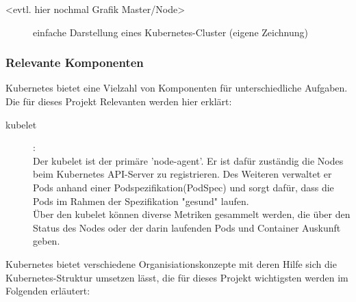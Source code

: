\documentclass[a4paper,10pt]{scrartcl}
\begin{document}
<evtl. hier nochmal Grafik Master/Node>


\begin{figure}[htbp]
  \centering
  
  \caption{einfache Darstellung eines Kubernetes-Cluster (eigene Zeichnung)}
\end{figure}

\pagebreak

\subsubsection{Relevante Komponenten}

Kubernetes bietet eine Vielzahl von Komponenten für unterschiedliche Aufgaben. Die für dieses Projekt Relevanten werden hier erklärt:

\begin{description}

\item [kubelet]: \\
Der kubelet ist der primäre 'node-agent'. Er ist dafür zuständig die Nodes beim Kubernetes API-Server zu registrieren. Des Weiteren verwaltet er Pods anhand einer Podspezifikation(PodSpec) und sorgt dafür, dass die Pods im Rahmen der Spezifikation "gesund" laufen.\\
Über den kubelet können diverse Metriken gesammelt werden, die über den Status des Nodes oder der darin laufenden Pods und Container Auskunft geben.\\

\end{description}

Kubernetes bietet verschiedene Organisiationskonzepte mit deren Hilfe sich die Kubernetes-Struktur umsetzen lässt, die für dieses Projekt wichtigsten werden im Folgenden erläutert:
\end{document}
